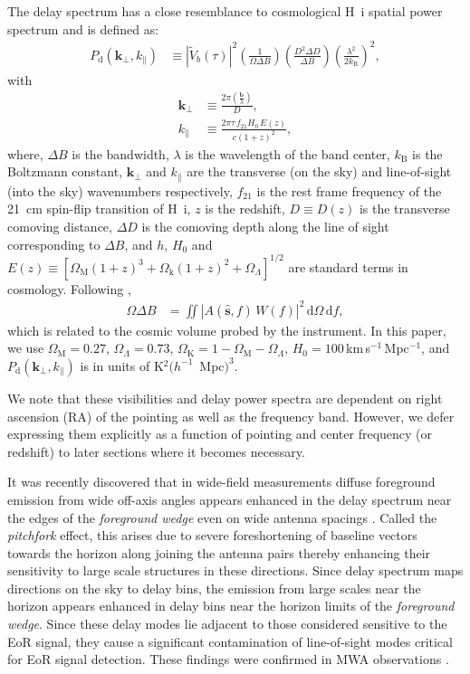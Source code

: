 \documentclass[preprint2,iop,numberedappendix,twocolappendix,appendixfloats]{emulateapj}
\newcommand{\dif}{\mathrm{d}}
\begin{document}
The delay spectrum has a close resemblance to cosmological H~{\sc i} spatial power spectrum and is defined as:
\begin{align}\label{eqn:delay-power-spectrum}
  P_\textrm{d}(\boldsymbol{k}_\perp,k_\parallel) &\equiv |\tilde{V}_b(\tau)|^2\left(\frac{1}{\Omega\Delta B}\right)\left(\frac{D^2\Delta D}{\Delta B}\right)\left(\frac{\lambda^2}{2k_\textrm{B}}\right)^2,
\end{align}
with
\begin{align}
  \boldsymbol{k}_\perp &\equiv \frac{2\pi(\frac{\boldsymbol{b}}{\lambda})}{D}, \label{eqn:kperp-baseline}\\
  k_\parallel &\equiv \frac{2\pi\tau\,f_{21}H_0\,E(z)}{c(1+z)^2}, \label{eqn:kprll-delay}
\end{align}
where, $\Delta B$ is the bandwidth, $\lambda$ is the wavelength of the band center, $k_\textrm{B}$ is the Boltzmann constant, $\boldsymbol{k}_\perp$ and $k_\parallel$ are the transverse (on the sky) and line-of-sight (into the sky) wavenumbers respectively, $f_{21}$ is the rest frame frequency of the 21~cm spin-flip transition of H~{\sc i}, $z$ is the redshift, $D\equiv D(z)$ is the transverse comoving distance, $\Delta D$ is the comoving depth along the line of sight corresponding to $\Delta B$, and $h$, $H_0$ and $E(z)\equiv [\Omega_\textrm{M}(1+z)^3+\Omega_\textrm{k}(1+z)^2+\Omega_\Lambda]^{1/2}$ are standard terms in cosmology. Following \citet{par14},
\begin{align}
  \Omega\Delta B &= \iint \left|A(\hat{\boldsymbol{s}},f)\,W(f)\right|^2\,\dif\Omega\,\dif f,
\end{align}
which is related to the cosmic volume probed by the instrument. In this paper, we use $\Omega_\textrm{M}=0.27$, $\Omega_\Lambda=0.73$, $\Omega_\textrm{K}=1-\Omega_\textrm{M}-\Omega_\Lambda$, $H_0=100\,$km$\,$s$^{-1}\,$Mpc$^{-1}$, and $P_\textrm{d}(\boldsymbol{k}_\perp,k_\parallel)$ is in units of K$^2 (h^{-1}$~Mpc$)^3$.

We note that these visibilities and delay power spectra are dependent on right ascension (RA) of the pointing as well as the frequency band. However, we defer expressing them explicitly as a function of pointing and center frequency (or redshift) to later sections where it becomes necessary.

It was recently discovered that in wide-field measurements diffuse foreground emission from wide off-axis angles appears enhanced in the delay spectrum near the edges of the {\it foreground wedge} even on wide antenna spacings \citep{thy15a}. Called the {\it pitchfork} effect, this arises due to severe foreshortening of baseline vectors towards the horizon along joining the antenna pairs thereby enhancing their sensitivity to large scale structures in these directions. Since delay spectrum maps directions on the sky to delay bins, the emission from large scales near the horizon appears enhanced in delay bins near the horizon limits of the {\it foreground wedge}. Since these delay modes lie adjacent to those considered sensitive to the EoR signal, they cause a significant contamination of line-of-sight modes critical for EoR signal detection. These findings were confirmed in MWA observations \citep{thy15b}.
\end{document}
